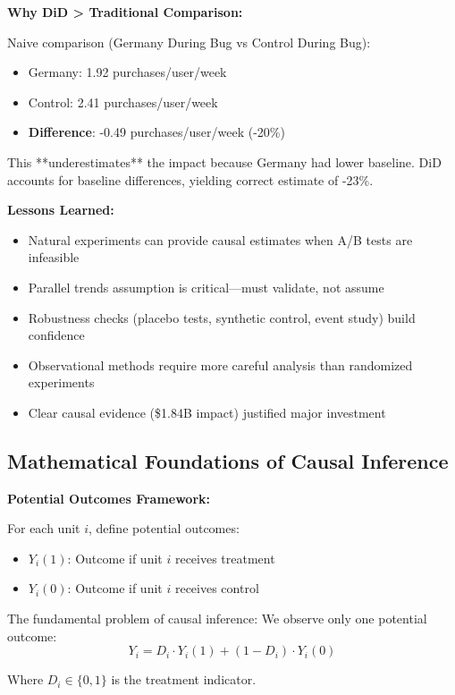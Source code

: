 \textbf{Why DiD > Traditional Comparison:}

Naive comparison (Germany During Bug vs Control During Bug):
\begin{itemize}
    \item Germany: 1.92 purchases/user/week
    \item Control: 2.41 purchases/user/week
    \item \textbf{Difference}: -0.49 purchases/user/week (-20\%)
\end{itemize}

This **underestimates** the impact because Germany had lower baseline. DiD accounts for baseline differences, yielding correct estimate of -23\%.

\textbf{Lessons Learned:}
\begin{itemize}
    \item Natural experiments can provide causal estimates when A/B tests are infeasible
    \item Parallel trends assumption is critical---must validate, not assume
    \item Robustness checks (placebo tests, synthetic control, event study) build confidence
    \item Observational methods require more careful analysis than randomized experiments
    \item Clear causal evidence (\$1.84B impact) justified major investment
\end{itemize}

\subsection{Mathematical Foundations of Causal Inference}

\textbf{Potential Outcomes Framework:}

For each unit $i$, define potential outcomes:
\begin{itemize}
    \item $Y_i(1)$: Outcome if unit $i$ receives treatment
    \item $Y_i(0)$: Outcome if unit $i$ receives control
\end{itemize}

The fundamental problem of causal inference: We observe only one potential outcome:
\begin{equation}
Y_i = D_i \cdot Y_i(1) + (1 - D_i) \cdot Y_i(0)
\end{equation}

Where $D_i \in \{0, 1\}$ is the treatment indicator.

